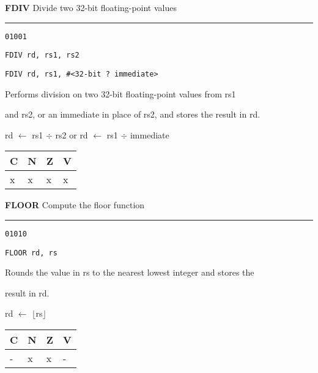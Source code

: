 \documentclass{article}
\begin{document}
\bigskip\bigskip

\flushleft
\LARGE\textbf{FDIV} \large \hfill Divide two 32-bit floating-point values

\kern-3pt
\noindent\rule{16.5cm}{0.4pt}
\normalsize

{\large
	 \texttt{01001} \par
	\smallbreak
	 \texttt{FDIV rd, rs1, rs2} \par
	\smallbreak
	 \texttt{FDIV rd, rs1, \#<32-bit ? immediate>} \par
	\smallbreak
	 Performs division on two 32-bit floating-point values from rs1 \par
	\makebox[3.5cm][l]{  } and rs2, or an immediate in place of rs2, and stores the result in rd. \par
	\smallbreak
	 rd $\leftarrow$ rs1 $\div$ rs2 \quad or \quad rd $\leftarrow$ rs1 $\div$ immediate\par
	\smallbreak
	 \begin{tabular}{llll} C \quad & N \quad & Z \quad & V \\ \hline x & x & x & x \\ \end{tabular}
}

\bigskip\bigskip

\flushleft
\LARGE\textbf{FLOOR} \large \hfill Compute the floor function

\kern-3pt
\noindent\rule{16.5cm}{0.4pt}
\normalsize

{\large
	 \texttt{01010} \par
	\smallbreak
	 \texttt{FLOOR rd, rs} \par
	\smallbreak
	 Rounds the value in rs to the nearest lowest integer and stores the \par
	\makebox[3.5cm][l]{  } result in rd. \par
	\smallbreak
	 rd $\leftarrow$ $\lfloor$rs$\rfloor$ \par
	\smallbreak
	 \begin{tabular}{llll} C \quad & N \quad & Z \quad & V \\ \hline - & x & x & - \\ \end{tabular}
}
\end{document}
